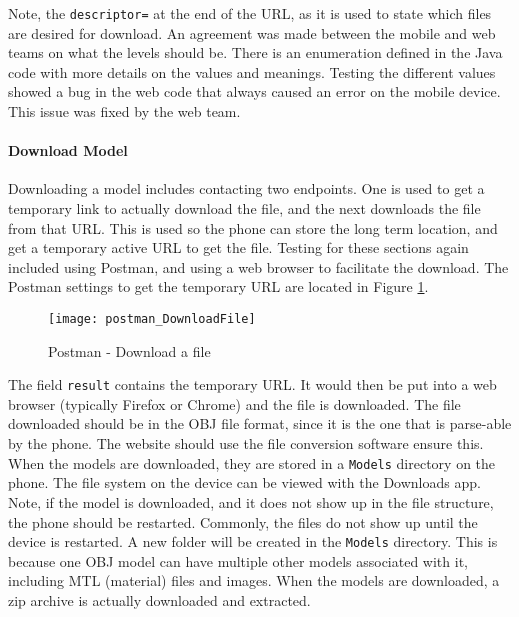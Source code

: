                 Note, the \texttt{descriptor=} at the end of the URL, as it is used to state which files are desired for download.  An agreement was made between the mobile and web teams on what the levels should be.  There is an enumeration defined in the Java code with more details on the values and meanings.  Testing the different values showed a bug in the web code that always caused an error on the mobile device.  This issue was fixed by the web team.
            
            \paragraph{Download Model}

                Downloading a model includes contacting two endpoints.  One is used to get a temporary link to actually download the file, and the next downloads the file from that URL.  This is used so the phone can store the long term location, and get a temporary active URL to get the file.  Testing for these sections again included using Postman, and using a web browser to facilitate the download.  The Postman settings to get the temporary URL are located in Figure \ref{fig:mobilePostmanDownloadFile}.

                \begin{figure}[H]
                    \texttt{[image: postman\_DownloadFile]}
                    \centering
                    \caption{Postman - Download a file}
                    \label{fig:mobilePostmanDownloadFile}
                \end{figure}

                The field \texttt{result} contains the temporary URL.  It would then be put into a web browser (typically Firefox or Chrome) and the file is downloaded.  The file downloaded should be in the OBJ file format, since it is the one that is parse-able by the phone.  The website should use the file conversion software ensure this.  When the models are downloaded, they are stored in a \texttt{Models} directory on the phone.  The file system on the device can be viewed with the Downloads app.  Note, if the model is downloaded, and it does not show up in the file structure, the phone should be restarted.  Commonly, the files do not show up until the device is restarted.  A new folder will be created in the \texttt{Models} directory.  This is because one OBJ model can have multiple other models associated with it, including MTL (material) files and images.  When the models are downloaded, a zip archive is actually downloaded and extracted.

